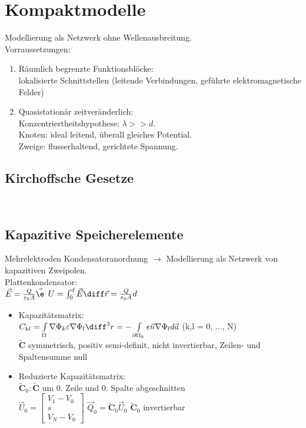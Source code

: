 \documentclass[german, fourcolumn, 6pt]{latex4ei/latex4ei_sheet}
\renewcommand{\ma}[1]{\ensuremath{\utilde{\boldsymbol {#1}}}}
\renewcommand{\mat}[1]{\ensuremath{\begin{bmatrix} #1 \end{bmatrix}}}
\begin{document}
    \section{Kompaktmodelle}
    Modellierung als Netzwerk ohne Wellenausbreitung.\\
    Vorraussetzungen:\\
    \begin{enumerate}
    \item Räumlich begrenzte Funktionsblöcke:\\
    lokalisierte Schnittstellen (leitende Verbindungen, geführte elektromagnetische Felder)\\
    \item Quasistationär zeitveränderlich:\\
    Konzentriertheitshypothese: $\lambda >> d$.\\
    Knoten: ideal leitend, überall gleiches Potential.\\
    Zweige: flusserhaltend, gerichtete Spannung.\\
    \end{enumerate}



    \subsection{Kirchoffsche Gesetze}
     \qquad {}\\

    \subsection{Kapazitive Speicherelemente}
    Mehrelektroden Kondensatoranordnung $\rightarrow$ Modellierung als Netzwerk von kapazitiven Zweipolen.\\
    Plattenkondensator: \\
$\vec E = \frac{Q}{\varepsilon_0A}\vec\e$ \qquad $U = \int_0^d \vec E\diff\vec r = \frac{Q}{\varepsilon_0A}d$
    \begin{itemize}
    \item Kapazitätsmatrix:\\
$C_{kl} = \int\limits_\Omega \nabla \Phi_k \varepsilon \nabla \Phi_l \diff^3 r = -\int\limits_{\partial\Omega_k} \epsilon \vec n \nabla \Phi_l d\vec a$ (k,l = 0, ..., N)\\
$\ma C$ symmetrisch, positiv semi-definit, nicht invertierbar, Zeilen- und Spaltensumme null\\
    \item Reduzierte Kapazitätsmatrix:\\
$\ma C_0: \ma C$ um 0. Zeile und 0. Spalte abgeschnitten\\
$\vec U_0 = \mat{ V_1 - V_0 \\ s \\ V_N - V_0 }$ \quad $\vec Q_0 = \ma C_0\vec U_0$ \quad $\ma C_0$ invertierbar\\

    \end{itemize}
\end{document}
